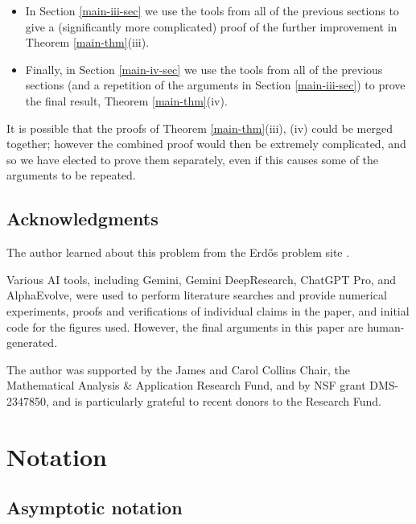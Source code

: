 \documentclass[12pt]{amsart}
\begin{document}
\begin{itemize}
    \item In Section \ref{main-iii-sec} we use the tools from all of the previous sections to give a (significantly more complicated) proof of the further improvement in Theorem \ref{main-thm}(iii).
    \item Finally, in Section \ref{main-iv-sec} we use the tools from all of the previous sections (and a repetition of the arguments in Section \ref{main-iii-sec}) to prove the final result, Theorem \ref{main-thm}(iv).
\end{itemize}

It is possible that the proofs of Theorem \ref{main-thm}(iii), (iv) could be merged together; however the combined proof would then be extremely complicated, and so we have elected to prove them separately, even if this causes some of the arguments to be repeated.

\subsection{Acknowledgments}

The author learned about this problem from the Erd\H{o}s problem site \cite{bloom}.

Various AI tools, including Gemini, Gemini DeepResearch, ChatGPT Pro, and AlphaEvolve, were used to perform literature searches and provide numerical experiments, proofs and verifications of individual claims in the paper, and initial code for the figures used.  However, the final arguments in this paper are human-generated.

The author was supported by the James and Carol Collins Chair, the Mathematical Analysis \& Application Research Fund, and by NSF grant DMS-2347850, and is particularly grateful to recent donors to the Research Fund.

\section{Notation}\label{notation-sec}

\subsection{Asymptotic notation}
\end{document}
